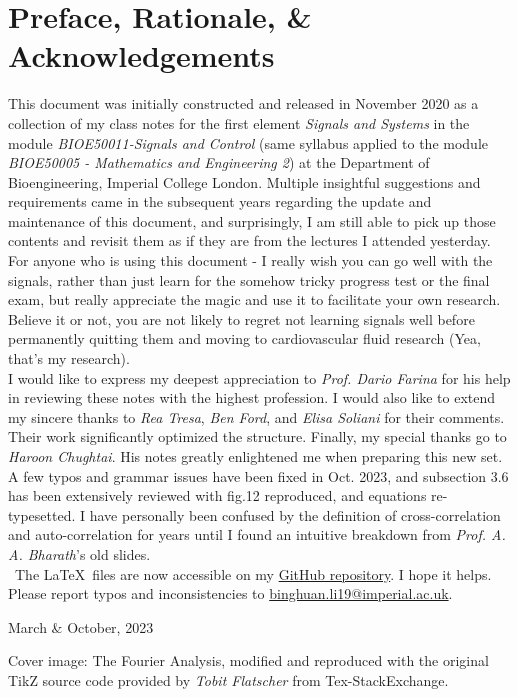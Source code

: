 \section*{Preface, Rationale, \& Acknowledgements}
This document was initially constructed and released in November 2020 as a collection of my class notes for the first element \textit{Signals and Systems} in the module \textit{BIOE50011-Signals and Control} (same syllabus applied to the module \textit{BIOE50005 - Mathematics and Engineering 2}) at the Department of Bioengineering, Imperial College London. Multiple insightful suggestions and requirements came in the subsequent years regarding the update and maintenance of this document, and surprisingly, I am still able to pick up those contents and revisit them as if they are from the lectures I attended yesterday. \\

For anyone who is using this document - I really wish you can go well with the signals, rather than just learn for the somehow tricky progress test or the final exam, but really appreciate the magic and use it to facilitate your own research. Believe it or not, you are not likely to regret not learning signals well before permanently quitting them and moving to cardiovascular fluid research (Yea, that's my research). \\

I would like to express my deepest appreciation to \emph{Prof. Dario Farina} for his help in reviewing these notes with the highest profession. I would also like to extend my sincere thanks to \emph{Rea Tresa}, \emph{Ben Ford}, and \emph{Elisa Soliani} for their comments. Their work significantly optimized the structure. Finally, my special thanks go to \emph{Haroon Chughtai}. His notes greatly enlightened me when preparing this new set. \\

A few typos and grammar issues have been fixed in Oct. 2023, and subsection 3.6 has been extensively reviewed with fig.12 reproduced, and equations re-typesetted. I have personally been confused by the definition of cross-correlation and auto-correlation for years until I found an intuitive breakdown from \textit{Prof. A. A. Bharath}'s old slides.\\

\faGithub \ The \LaTeX \ files are now accessible on my \href{https://github.com/binghuan-li/Notes-and-Formula-Sheets}{GitHub repository}. I hope it helps. Please report typos and inconsistencies to \href{mailto:binghuan.li19@imperial.ac.uk}{binghuan.li19@imperial.ac.uk}.

\begin{flushright}
March \& October, 2023
\end{flushright}

\vfill
{\color{gray}
Cover image: The Fourier Analysis, modified and reproduced with the original TikZ source code provided by \textit{Tobit Flatscher} from Tex-StackExchange.
}